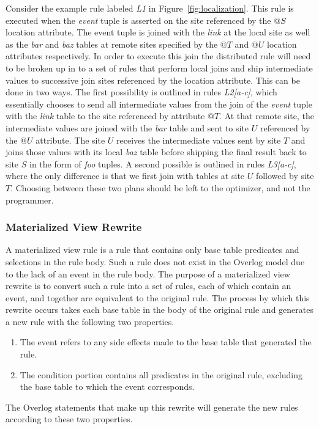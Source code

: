 \documentclass{vldb}
\begin{document}
Consider the example rule labeled {\em L1} in Figure~\ref{fig:localization}.  This rule
is executed when the {\em event} tuple is asserted on the site referenced by
the $@S$ location attribute. The event tuple is joined with the {\em link} at the
local site as well as the {\em bar} and {\em baz} tables at remote sites specified by
the $@T$ and $@U$ location attributes respectively.  In order to execute this join the
distributed rule will need to be broken up in to a set of rules that perform local joins
and ship intermediate values to successive join sites referenced by the location
attribute.  This can be done in two ways.
The first possibility is outlined in rules {\em L2[a-c]}, which essentially chooses to 
send all intermediate values from the join of the {\em event} tuple with the {\em link}
table to the site referenced by attribute $@T$.  At that remote site, the 
intermediate values are joined with the {\em bar} table and sent to site $U$ referenced
by the $@U$ attribute. The site $U$ receives the intermediate values sent by site $T$
and joins those values with its local {\em baz} table before shipping the final result 
back to site $S$ in the form of {\em foo} tuples. A second possible is outlined in rules
{\em L3[a-c]}, where the only difference is that we first join with tables at site $U$ 
followed by site $T$.  Choosing between these two plans should be left to the optimizer,
and not the programmer.

\subsubsection{Materialized View Rewrite}

A materialized view rule is a rule that contains only base table predicates and
selections in the rule body. Such a rule does not
exist in the Overlog model due to the lack of an event in the rule body. 
The purpose of a materialized view rewrite is to convert such a rule into a set 
of rules, each of which contain an event, and together are equivalent to the original
rule. The process by which this rewrite occurs takes each
base table in the body of the original rule and generates a new rule with the
following two properties.
\begin{enumerate}
\item The event refers to any side effects made to the base table that generated the rule.
\item The condition portion contains all predicates in the original rule, excluding the base table to which the event corresponds.
\end{enumerate}
The Overlog statements that make up this rewrite will generate the new rules 
according to these two properties.
\end{document}
